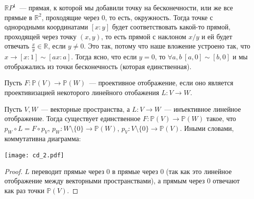 \documentclass[11pt]{report}
\begin{document}
    \begin{example}
    $\mathbb{R}P^1$~--- прямая, к которой мы добавили точку на бесконечности, или же все прямые в $\mathbb{R}^2$, проходящие через 0, то есть, окружность.
     Тогда точке с однородными координатами $[x:y]$ будет соответствовать какой-то прямой, проходящей через точку $(x, y)$, то есть прямой с наклоном $x / y$ и ей будет отвечать $\frac{x}{y} \in \mathbb{R}$, если $y \neq 0$.
    Это так, потому что наше вложение устроено так, что $x \to [x : 1] \sim [ax : a]$. Тогда ясно, что если $y = 0$, то $\forall a, b \ [a, 0] \sim [b, 0]$ и мы отображались из точки бесконечность (которая единственная).
    \end{example}
     \begin{definition}
         Пусть $F\colon \mathbb{P}(V) \to \mathbb{P}(W)$~--- проективное отображение, если оно является проективизацией некоторого линейного отобажения $L\colon V \to W$.
    \end{definition}
    \begin{lemma}
        Пусть $V, W$~--- векторные пространства, а $L\colon V \to W$~---   инъективное линейное отображение. Тогда существует единственное $F\colon \mathbb{P}(V) \to \mathbb{P}(W)$ такое, что
        $p_W \circ L = F \circ p_V$, $p_W \colon W \setminus \{ 0\} \to \mathbb{P}(W)$, $p_V \colon V \setminus \{ 0\} \to \mathbb{P}(V)$.
        Иными словами, коммутативна диаграмма:
        \begin{center}
            \texttt{[image: cd\_2.pdf]}
        \end{center}
    \end{lemma}
    \begin{proof}
        $L$ переводит прямые через 0 в прямые через 0 (так как это линейное отображение между векторными пространствами), а прямым через 0 отвечают как раз точки $\mathbb{P}(V)$.
    \end{proof}
\end{document}
